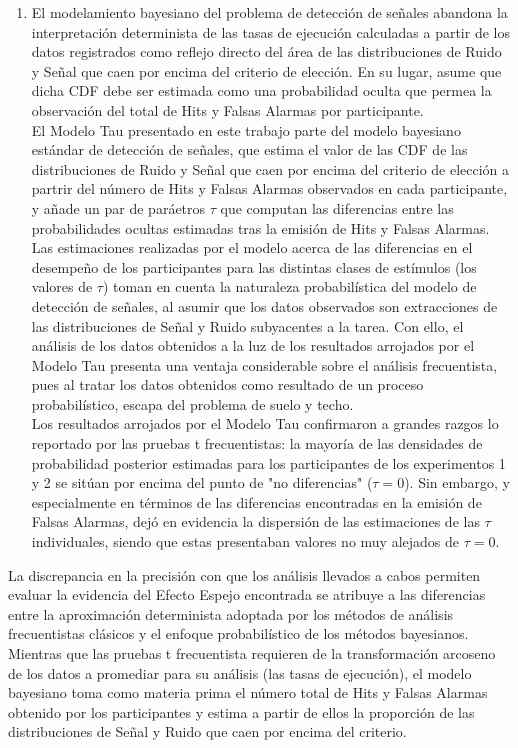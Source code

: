 \begin{enumerate}
\item El modelamiento bayesiano del problema de detección de señales abandona la interpretación determinista de las tasas de ejecución calculadas a partir de los datos registrados como reflejo directo del área de las distribuciones de Ruido y Señal que caen por encima del criterio de elección. En su lugar, asume que dicha CDF debe ser estimada como una probabilidad oculta que permea la observación del total de Hits y Falsas Alarmas por participante.\\

El Modelo Tau presentado en este trabajo parte del modelo bayesiano estándar de detección de señales, que estima el valor de las CDF de las distribuciones de Ruido y Señal que caen por encima del criterio de elección a partrir del número de Hits y Falsas Alarmas observados en cada participante, y añade un par de paráetros $\tau$ que computan las diferencias entre las probabilidades ocultas estimadas tras la emisión de Hits y Falsas Alarmas. Las estimaciones realizadas por el modelo acerca de las diferencias en el desempeño de los participantes para las distintas clases de estímulos (los valores de $\tau$) toman en cuenta la naturaleza probabilística del modelo de detección de señales, al asumir que los datos observados son extracciones de las distribuciones de Señal y Ruido subyacentes a la tarea. Con ello, el análisis de los datos obtenidos a la luz de los resultados arrojados por el Modelo Tau presenta una ventaja considerable sobre el análisis frecuentista, pues al tratar los datos obtenidos como resultado de un proceso probabilístico, escapa del problema de suelo y techo.\\

Los resultados arrojados por el Modelo Tau confirmaron a grandes razgos lo reportado por las pruebas t frecuentistas: la mayoría de las densidades de probabilidad posterior estimadas para los participantes de los experimentos 1 y 2 se sitúan por encima del punto de "no diferencias" ($\tau = 0$). Sin embargo, y especialmente en términos de las diferencias encontradas en la emisión de Falsas Alarmas, dejó en evidencia la dispersión de las estimaciones de las $\tau$ individuales, siendo que estas presentaban valores no muy alejados de $\tau = 0$.\\
\end{enumerate}

La discrepancia en la precisión con que los análisis llevados a cabos permiten evaluar la evidencia del Efecto Espejo encontrada se atribuye a las diferencias entre la aproximación determinista adoptada por los métodos de análisis frecuentistas clásicos y el enfoque probabilístico de los métodos bayesianos. Mientras que las pruebas t frecuentista requieren de la transformación arcoseno de los datos a promediar para su análisis (las tasas de ejecución), el modelo bayesiano toma como materia prima el número total de Hits y Falsas Alarmas obtenido por los participantes y estima a partir de ellos la proporción de las distribuciones de Señal y Ruido que caen por encima del criterio. \\

